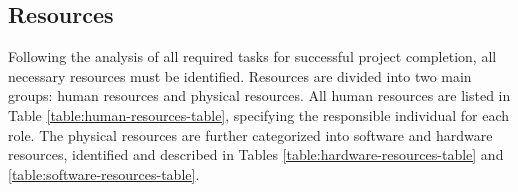 \subsection{Resources}

Following the analysis of all required tasks for successful project completion, all necessary resources must be identified.  Resources are divided into two main groups: human resources and physical resources. All human resources are listed in Table \ref{table:human-resources-table}, specifying the responsible individual for each role. The physical resources are further categorized into software and hardware resources, identified and described in Tables \ref{table:hardware-resources-table} and \ref{table:software-resources-table}.


